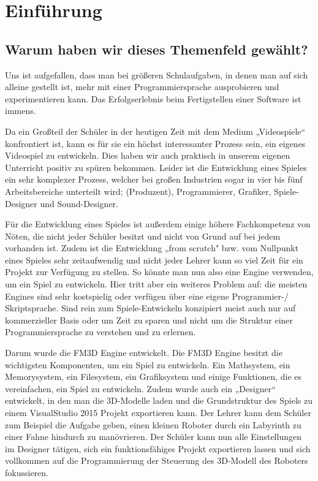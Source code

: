 
\chapter{Einführung}
\label{c:einführung}
\setcounter{page}{1}
\section[Warum dieses Themenfeld?]{Warum haben wir dieses Themenfeld gewählt?}

Uns ist aufgefallen, dass man bei größeren Schulaufgaben, in denen man auf sich alleine gestellt ist, mehr mit einer Programmiersprache ausprobieren und experimentieren kann. Das Erfolgserlebnis beim Fertigstellen einer Software ist immens. 

Da ein Großteil der Schüler in der heutigen Zeit mit dem Medium „Videospiele“ konfrontiert ist, kann es für sie ein höchst interessanter Prozess sein, ein eigenes Videospiel zu entwickeln. Dies haben wir auch praktisch in unserem eigenen Unterricht positiv zu spüren bekommen.
Leider ist die Entwicklung eines Spieles ein sehr komplexer Prozess, welcher bei großen Industrien sogar in vier bis fünf Arbeitsbereiche unterteilt wird; (Produzent), Programmierer, Grafiker, Spiele-Designer und Sound-Designer.  \cite{gea}

Für die Entwicklung eines Spieles ist außerdem einige höhere Fachkompetenz von Nöten, die nicht jeder Schüler besitzt und nicht von Grund auf bei jedem vorhanden ist. Zudem ist die Entwicklung „from scratch" bzw. vom Nullpunkt eines Spieles sehr zeitaufwendig und nicht jeder Lehrer kann so viel Zeit für ein Projekt zur Verfügung zu stellen. 
So könnte man nun also eine Engine verwenden, um ein Spiel zu entwickeln. Hier tritt aber ein weiteres Problem auf: die meisten Engines sind sehr kostspielig oder verfügen über eine eigene Programmier-/ Skriptsprache. Sind rein zum Spiele-Entwickeln konzipiert meist auch nur auf kommerzieller Basis oder um Zeit zu sparen und nicht um die Struktur einer Programmiersprache zu verstehen und zu erlernen.

Darum wurde die \ac{FM3D} Engine entwickelt. Die FM3D Engine besitzt die wichtigsten Komponenten, um ein Spiel zu entwickeln. Ein Mathsystem, ein Memorysystem, ein Filesystem, ein Grafiksystem und einige Funktionen, die es vereinfachen, ein Spiel zu entwickeln.
Zudem wurde auch ein „Designer“ entwickelt, in den man die 3D-Modelle laden und die Grundstruktur des Spiels zu einem VisualStudio 2015 Projekt exportieren kann.
Der Lehrer kann dem Schüler zum Beispiel die Aufgabe geben, einen kleinen Roboter durch ein Labyrinth zu einer Fahne hindurch zu manövrieren. Der Schüler kann nun alle Einstellungen im Designer tätigen, sich ein funktionsfähiges Projekt exportieren lassen und sich vollkommen auf die Programmierung der Steuerung des 3D-Modell des Roboters fokussieren.

